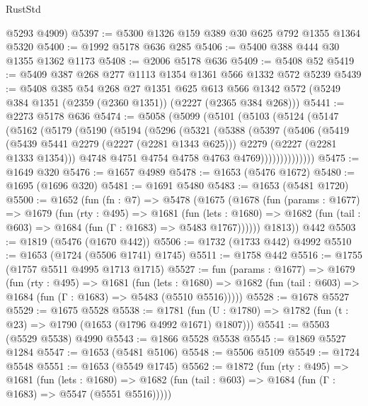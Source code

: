 \begin{lexlean}{RustStd}
\begin{coremodule}
      @5293
      @4909)
@5397 := @5300 @1326 @159 @389 @30 @625 @792 @1355 @1364 @5320
@5400 := @1992 @5178 @636 @285
@5406 := @5400 @388 @444 @30 @1355 @1362 @1173
@5408 := @2006 @5178 @636
@5409 := @5408 @52
@5419 := @5409 @387 @268 @277 @1113 @1354 @1361 @566 @1332 @572 @5239
@5439 := @5408
    @385
    @54
    @268
    @27
    @1351
    @625
    @613
    @566
    @1342
    @572
    (@5249 @384 @1351 (@2359 (@2360 @1351)) (@2227 (@2365 @384 @268)))
@5441 := @2273 @5178 @636
@5474 := @5058
    (@5099
      (@5101
        (@5103
          (@5124
            (@5147
              (@5162
                (@5179
                  (@5190
                    (@5194
                      (@5296
                        (@5321
                          (@5388
                            (@5397
                              (@5406
                                (@5419
                                  (@5439 @5441 @2279 (@2227 (@2281 @1343 @625)))
                                  @2279
                                  (@2227 (@2281 @1333 @1354)))
                                @4748
                                @4751
                                @4754
                                @4758
                                @4763
                                @4769))))))))))))))
@5475 := @1649 @320
@5476 := @1657 @4989
@5478 := @1653 (@5476 @1672)
@5480 := @1695 (@1696 @320)
@5481 := @1691 @5480
@5483 := @1653 (@5481 @1720)
@5500 := @1652
    (fun (fn : @7) =>
    @5478
      (@1675
        (@1678
          (fun (params : @1677) =>
          @1679
            (fun (rty : @495) =>
            @1681
              (fun (lets : @1680) =>
              @1682 (fun (tail : @603) => @1684 (fun (Γ : @1683) => @5483 @1767))))))
        @1813))
    @442
@5503 := @1819 (@5476 (@1670 @442))
@5506 := @1732 (@1733 @442) @4992
@5510 := @1653 (@1724 (@5506 @1741) @1745)
@5511 := @1758 @442
@5516 := @1755 (@1757 @5511 @4995 @1713 @1715)
@5527 := fun (params : @1677) =>
  @1679
    (fun (rty : @495) =>
    @1681
      (fun (lets : @1680) =>
      @1682 (fun (tail : @603) => @1684 (fun (Γ : @1683) => @5483 (@5510 @5516)))))
@5528 := @1678 @5527
@5529 := @1675 @5528
@5538 := @1781 (fun (U : @1780) => @1782 (fun (t : @23) => @1790 (@1653 (@1796 @4992 @1671) @1807)))
@5541 := @5503 (@5529 @5538) @4990
@5543 := @1866 @5528 @5538
@5545 := @1869 @5527 @1284
@5547 := @1653 (@5481 @5106)
@5548 := @5506 @5109
@5549 := @1724 @5548
@5551 := @1653 (@5549 @1745)
@5562 := @1872
    (fun (rty : @495) =>
    @1681
      (fun (lets : @1680) =>
      @1682 (fun (tail : @603) => @1684 (fun (Γ : @1683) => @5547 (@5551 @5516)))))

\end{coremodule}
\end{lexlean}
